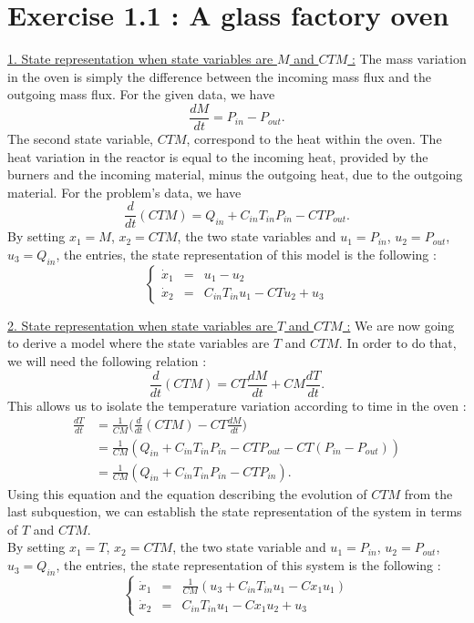 \section*{Exercise 1.1 : A glass factory oven}
\underline{1. State representation when state variables are $M$ and $CTM$ :}
The mass variation in the oven is simply the difference between the incoming mass flux and the outgoing mass flux. For the given data, we have $$\frac{dM}{dt} = P_{in}-P_{out}.$$
The second state variable, $CTM$, correspond to the heat within the oven. The heat variation in the reactor is equal to the incoming heat, provided by the burners and the incoming material, minus the outgoing heat, due to the outgoing material. For the problem's data, we have $$\frac{d}{dt}(CTM) = Q_{in} + C_{in}T_{in}P_{in} - CTP_{out}.$$
By setting $x_1 = M$, $x_2 = CTM$, the two state variables and $u_1 = P_{in}$, $u_2 = P_{out}$, $u_3 = Q_{in}$, the entries, the state representation of this model is the following :
$$\left\{\begin{array}{ccl}
\dot{x}_1 & = & u_1 - u_2 \\
\dot{x}_2 & = & C_{in}T_{in}u_1 - CTu_2 + u_3
\end{array}\right.$$
 
\underline{2. State representation when state variables are $T$ and $CTM$ :}
We are now going to derive a model where the state variables are $T$ and $CTM$. In order to do that, we will need the following relation : $$\frac{d}{dt}(CTM) = CT\frac{dM}{dt} + CM\frac{dT}{dt}.$$
This allows us to isolate the temperature variation according to time in the oven :
\begin{align*}
\frac{dT}{dt} & = \frac{1}{CM}\Big(\frac{d}{dt}(CTM)-CT\frac{dM}{dt}\Big)\\
& = \frac{1}{CM}(Q_{in} + C_{in}T_{in}P_{in} - CTP_{out} - CT(P_{in}-P_{out}))\\
& = \frac{1}{CM}(Q_{in} + C_{in}T_{in}P_{in} - CTP_{in}).
\end{align*}
Using this equation and the equation describing the evolution of $CTM$ from the last subquestion, we can establish the state representation of the system in terms of $T$ and $CTM$.\\
By setting $x_1 = T$, $x_2 = CTM$, the two state variable and $u_1 = P_{in}$, $u_2 = P_{out}$, $u_3 = Q_{in}$, the entries, the state representation of this system is the following :
$$\left\{\begin{array}{ccl}
\dot{x}_1 & = & \frac{1}{CM}(u_3 + C_{in}T_{in}u_1 - Cx_1u_1) \\
\dot{x}_2 & = & C_{in}T_{in}u_1 - Cx_1u_2 + u_3
\end{array}\right.$$

